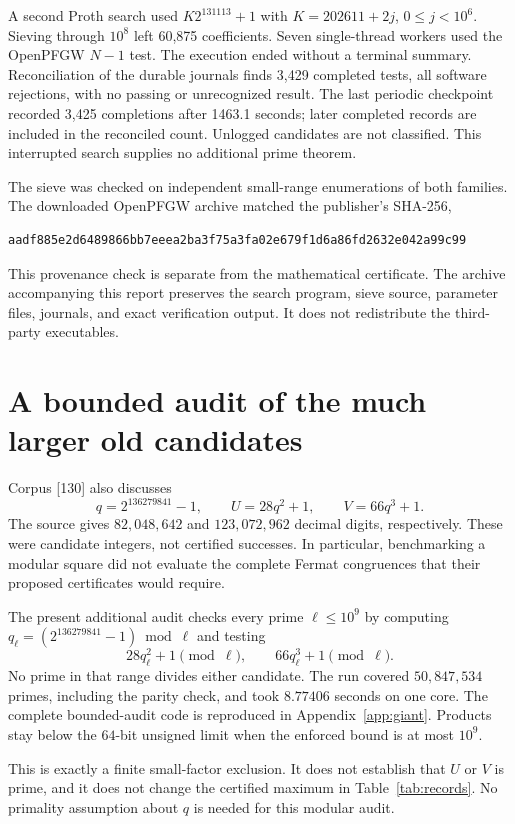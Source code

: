 \documentclass[11pt,a4paper]{article}
\theoremstyle{definition}\newtheorem{definition}[theorem]{Definition}
\theoremstyle{remark}\newtheorem{remark}[theorem]{Remark}
\begin{document}
A second Proth search used $K2^{131113}+1$ with $K=202611+2j$, $0\leq j<10^6$. Sieving through $10^8$ left 60,875 coefficients. Seven single-thread workers used the OpenPFGW $N-1$ test. The execution ended without a terminal summary. Reconciliation of the durable journals finds 3,429 completed tests, all software rejections, with no passing or unrecognized result. The last periodic checkpoint recorded 3,425 completions after 1463.1 seconds; later completed records are included in the reconciled count. Unlogged candidates are not classified. This interrupted search supplies no additional prime theorem.

The sieve was checked on independent small-range enumerations of both
families. The downloaded OpenPFGW archive matched the publisher's SHA-256,
\begin{lstlisting}[numbers=none]
aadf885e2d6489866bb7eeea2ba3f75a3fa02e679f1d6a86fd2632e042a99c99
\end{lstlisting}
This provenance check is separate from the mathematical certificate.
The archive accompanying this report preserves the search program, sieve
source, parameter files, journals, and exact verification output. It does
not redistribute the third-party executables.

\section{A bounded audit of the much larger old candidates}
Corpus [130] also discusses
\[
 q=2^{136279841}-1,\qquad
 U=28q^2+1,\qquad V=66q^3+1.
\]
The source gives $82,048,642$ and $123,072,962$ decimal digits, respectively.
These were candidate integers, not certified successes. In particular,
benchmarking a modular square did not evaluate the complete Fermat
congruences that their proposed certificates would require.

The present additional audit checks every prime $\ell\leq10^9$ by
computing $q_\ell=(2^{136279841}-1)\bmod\ell$ and testing
\[
 28q_\ell^2+1\pmod\ell,\qquad66q_\ell^3+1\pmod\ell.
\]
No prime in that range divides either candidate. The run covered
$50,847,534$ primes, including the parity check, and took $8.77406$
seconds on one core. The complete bounded-audit code is reproduced in
Appendix~\ref{app:giant}. Products stay below the $64$-bit unsigned limit
when the enforced bound is at most $10^9$.

This is exactly a finite small-factor exclusion. It does not establish
that $U$ or $V$ is prime, and it does not change the certified maximum in
Table~\ref{tab:records}. No primality assumption about $q$ is needed for
this modular audit.
\end{document}

